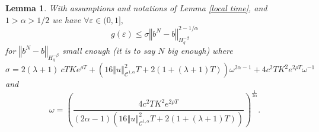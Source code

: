 \documentclass[12pt]{article}
\newtheorem{lem}[theo]{Lemma}
\newcommand{\norme}[1]{\left\Vert #1\right\Vert}
\begin{document}
\begin{lem}\label{key lemma}
    With assumptions and notations of Lemma \ref{local time}, and $1>\alpha>1/2$ we have $\forall \varepsilon\in(0,1],$
    \begin{equation}
    g(\varepsilon) \leq \sigma\norme{b^N-b}_{H^{-\beta}_{q}}^{2-1/\alpha}
    \end{equation}
    for $\norme{b^N-b}_{H^{-\beta}_{q}}$ small enough (it is to say $N$ big enough) where \begin{equation*}
    \sigma = 2(\lambda + 1)\ cT Ke^{\rho T} + \left(16\norme{u}_{\mathcal{C}^{1,\alpha}}^2 T + 2(1+(\lambda + 1)T)\right) \omega^{2\alpha-1} + 4c^2T K^2e^{2\rho T}\omega^{-1}
    \end{equation*} and \begin{equation*}
    \omega = \left(\frac{4c^2T K^2e^{2\rho T}}{(2\alpha-1)\left(16\norme{u}_{\mathcal{C}^{1,\alpha}}^2 T + 2(1+(\lambda + 1)T)\right)}\right)^{\frac{1}{2\alpha}}.
    \end{equation*}
\end{lem}
\end{document}
